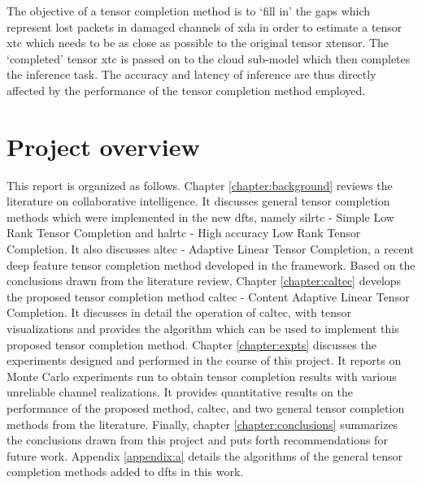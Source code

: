 The objective of a tensor completion method is to `fill in' the gaps which represent lost packets in damaged channels of \gls{xda} in order to estimate a tensor \gls{xtc} which needs to be as close as possible to the original tensor \gls{xtensor}. The `completed' tensor \gls{xtc} is passed on to the cloud sub-model which then completes the inference task. The accuracy and latency of inference are thus directly affected by the performance of the tensor completion method employed.

\section{Project overview}
This report is organized as follows. Chapter \ref{chapter:background} reviews the literature on collaborative intelligence. It discusses general tensor completion methods which were implemented in the new \gls{dfts}, namely \gls{silrtc} - Simple Low Rank Tensor Completion and \gls{halrtc} - High accuracy Low Rank Tensor Completion. It also discusses \gls{altec} - Adaptive Linear Tensor Completion, a recent deep feature tensor completion method developed in the  framework. Based on the conclusions drawn from the literature review, Chapter \ref{chapter:caltec} develops the proposed tensor completion method \gls{caltec} - Content Adaptive Linear Tensor Completion. It discusses in detail the operation of \gls{caltec}, with tensor visualizations and provides the algorithm which can be used to implement this proposed tensor completion method. Chapter \ref{chapter:expts} discusses the experiments designed and performed in the course of this project. It reports on Monte Carlo experiments run to obtain tensor completion results with various unreliable channel realizations. It provides quantitative results on the performance of the proposed method, \gls{caltec}, and two general tensor completion methods from the literature. Finally, chapter \ref{chapter:conclusions} summarizes the conclusions drawn from this project and puts forth recommendations for future work. Appendix \ref{appendix:a} details the algorithms of the general tensor completion methods added to \gls{dfts} in this work.
